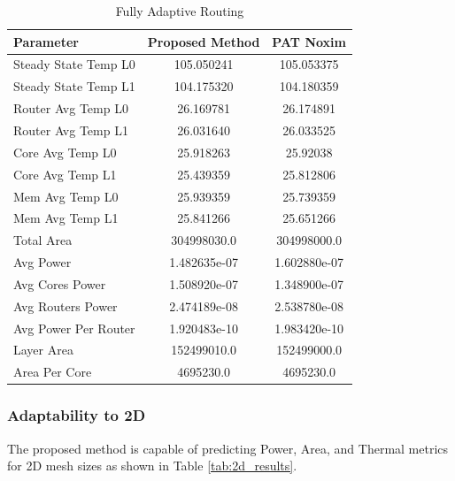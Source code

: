 \documentclass[conference]{IEEEtran}
\begin{document}
	\begin{table}[h!]
		\centering
		\begin{tabular}{|l|c|c|}
			\hline
			\textbf{Parameter} & \textbf{Proposed Method} & \textbf{PAT Noxim} \\ \hline
			Steady State Temp L0 & 105.050241 & 105.053375 \\ \hline
			Steady State Temp L1 & 104.175320 & 104.180359 \\ \hline
			Router Avg Temp L0 &26.169781 & 26.174891 \\ \hline
			Router Avg Temp L1 & 26.031640 & 26.033525 \\ \hline
			Core Avg Temp L0 & 25.918263 & 25.92038 \\ \hline
			Core Avg Temp L1 &25.439359 & 25.812806 \\ \hline
			Mem Avg Temp L0 & 25.939359 & 25.739359 \\ \hline
			Mem Avg Temp L1 &  25.841266 & 25.651266 \\ \hline
			Total Area & 304998030.0 & 304998000.0 \\ \hline
			Avg Power &1.482635e-07 & 1.602880e-07 \\ \hline
			Avg Cores Power & 1.508920e-07 & 1.348900e-07 \\ \hline
			Avg Routers Power &2.474189e-08 & 2.538780e-08 \\ \hline
			Avg Power Per Router & 1.920483e-10 & 1.983420e-10 \\ \hline
			Layer Area & 152499010.0 & 152499000.0 \\ \hline
			Area Per Core & 4695230.0 & 4695230.0 \\ \hline
		\end{tabular}
		\caption{Fully Adaptive Routing}
		\label{table:fully_adaptive_routing}
	\end{table}
	
	\subsubsection{Adaptability to 2D}
	The proposed method is capable of predicting Power, Area, and Thermal metrics for 2D mesh sizes as shown in Table \ref{tab:2d_results}.
	
\end{document}

